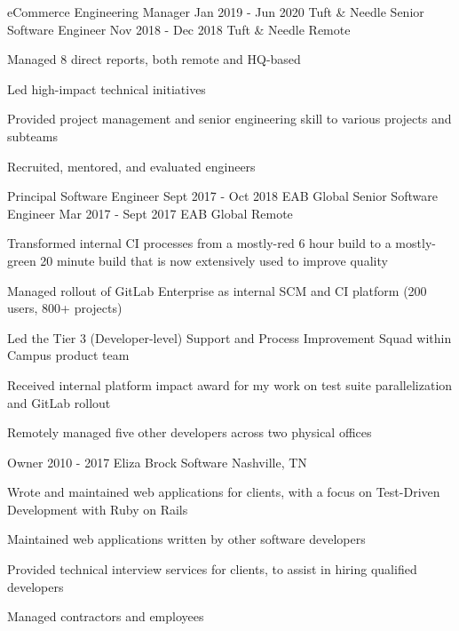 \begin{cventries}
  \doublecventry
  {eCommerce Engineering Manager}
  {Jan 2019 - Jun 2020}
  {Tuft \& Needle}
  {Senior Software Engineer}
  {Nov 2018 - Dec 2018}
  {Tuft \& Needle}
  {}
  {Remote}
  {
    \begin{cvitems}
      \item Managed 8 direct reports, both remote and HQ-based
      \item Led high-impact technical initiatives
      \item Provided project management and senior engineering skill to various projects and subteams
      \item Recruited, mentored, and evaluated engineers
    \end{cvitems}
    \cvtags{
      \tagRuby
      \tagRails
      \tagPostgreSQL
      \tagAccessibility
      \tagCIShort
      \tagTDDShort
      \tagECommerce
      \tagPeopleManagement
      \tagProjectManagement
    }
  }

  \doublecventry
  {Principal Software Engineer}
  {Sept 2017 - Oct 2018}
  {EAB Global}
  {Senior Software Engineer}
  {Mar 2017 - Sept 2017}
  {EAB Global}
  {}
  {Remote}
  {
    \begin{cvitems}
      \item Transformed internal CI processes from a mostly-red 6 hour build to a mostly-green 20 minute build that is now extensively used to improve quality
      \item Managed rollout of GitLab Enterprise as internal SCM and CI platform (200 users, 800+ projects)
      \item Led the Tier 3 (Developer-level) Support and Process Improvement Squad within Campus product team
      \item Received internal platform impact award for my work on test suite parallelization and GitLab rollout
      \item Remotely managed five other developers across two physical offices
    \end{cvitems}
    \cvtags{
      \tagRuby
      \tagRails
      \tagMySQL
      \tagCIShort
      \tagTDDShort
      \tagPeopleManagement
      \tagProjectManagement
    }
  }

  \cventry
  {Owner}
  {2010 - 2017}
  {Eliza Brock Software}
  {Nashville, TN}
  {
    \begin{cvitems}
      \item Wrote and maintained web applications for clients, with a focus on Test-Driven \mbox{Development} with Ruby on Rails
      \item Maintained web applications written by other software developers
      \item Provided technical interview services for clients, to assist in hiring qualified developers
      \item Managed contractors and employees
    \end{cvitems}
    \cvtags{
      \tagRuby
      \tagHAML
      \tagJavaScript
      \tagSASS
      \tagRails
      \tagPostgreSQL
      \tagCIShort
      \tagTDDShort
      \tagPairProgramming
      \tagECommerce
      \tagPeopleManagement
      \tagProjectManagement
      \tagBalsamiq
      \tagPerl
      \tagPHP
    }
  }


\end{cventries}
